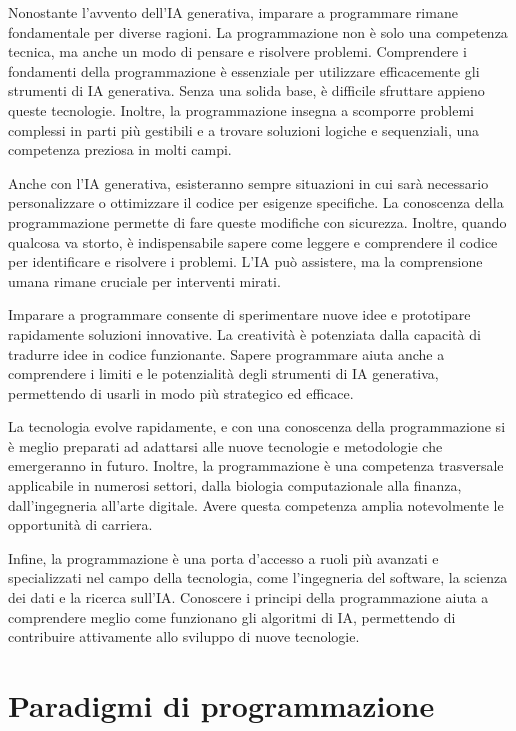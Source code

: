 \documentclass[
  letterpaper,
]{scrbook}
\begin{document}
Nonostante l'avvento dell'IA generativa, imparare a programmare rimane
fondamentale per diverse ragioni. La programmazione non è solo una
competenza tecnica, ma anche un modo di pensare e risolvere problemi.
Comprendere i fondamenti della programmazione è essenziale per
utilizzare efficacemente gli strumenti di IA generativa. Senza una
solida base, è difficile sfruttare appieno queste tecnologie. Inoltre,
la programmazione insegna a scomporre problemi complessi in parti più
gestibili e a trovare soluzioni logiche e sequenziali, una competenza
preziosa in molti campi.

Anche con l'IA generativa, esisteranno sempre situazioni in cui sarà
necessario personalizzare o ottimizzare il codice per esigenze
specifiche. La conoscenza della programmazione permette di fare queste
modifiche con sicurezza. Inoltre, quando qualcosa va storto, è
indispensabile sapere come leggere e comprendere il codice per
identificare e risolvere i problemi. L'IA può assistere, ma la
comprensione umana rimane cruciale per interventi mirati.

Imparare a programmare consente di sperimentare nuove idee e prototipare
rapidamente soluzioni innovative. La creatività è potenziata dalla
capacità di tradurre idee in codice funzionante. Sapere programmare
aiuta anche a comprendere i limiti e le potenzialità degli strumenti di
IA generativa, permettendo di usarli in modo più strategico ed efficace.

La tecnologia evolve rapidamente, e con una conoscenza della
programmazione si è meglio preparati ad adattarsi alle nuove tecnologie
e metodologie che emergeranno in futuro. Inoltre, la programmazione è
una competenza trasversale applicabile in numerosi settori, dalla
biologia computazionale alla finanza, dall'ingegneria all'arte digitale.
Avere questa competenza amplia notevolmente le opportunità di carriera.

Infine, la programmazione è una porta d'accesso a ruoli più avanzati e
specializzati nel campo della tecnologia, come l'ingegneria del
software, la scienza dei dati e la ricerca sull'IA. Conoscere i principi
della programmazione aiuta a comprendere meglio come funzionano gli
algoritmi di IA, permettendo di contribuire attivamente allo sviluppo di
nuove tecnologie.

\chapter{Paradigmi di programmazione}\label{paradigmi-di-programmazione}
\end{document}
